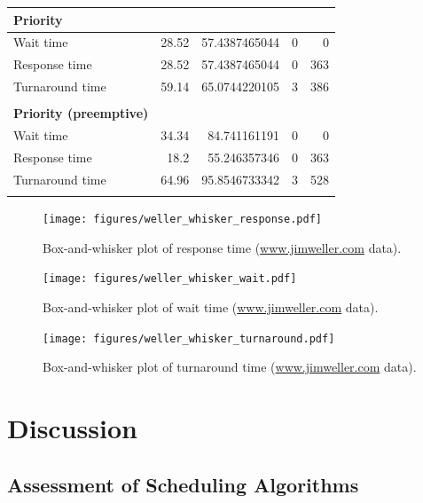 \documentclass[12pt,letterpaper]{article}
\begin{document}
\begin{table}
\begin{tabular}{l r r r r}
				\\
				\textbf{Priority} \\
				\hline
Wait time &		28.52 &	57.4387465044 &	0 &	0 	\\
Response time &		28.52 &	57.4387465044 &	0 &	363 	\\
Turnaround time &	59.14 &	65.0744220105 &	3 &	386 	\\
				\\
				\textbf{Priority (preemptive)} \\
				\hline
Wait time &		34.34 &	84.741161191 &	0 &	0 	\\
Response time &		18.2 &	55.246357346 &	0 &	363 	\\
Turnaround time &	64.96 &	95.8546733342 &	3 &	528 	\\

				\\
			\end{tabular}
		\end{table}

  	  	\begin{figure}[H]
			\centerline{\texttt{[image: figures/weller\_whisker\_response.pdf]}}
			\caption{Box-and-whisker plot of response time (\url{www.jimweller.com} data).}
			\label{fig:jim_whisker_response}
		\end{figure}

		\begin{figure}[H]
			\centerline{\texttt{[image: figures/weller\_whisker\_wait.pdf]}}
			\caption{Box-and-whisker plot of wait time (\url{www.jimweller.com} data).}
			\label{fig:jim_whisker_wait}
		\end{figure}

		\begin{figure}[H]
			\centerline{\texttt{[image: figures/weller\_whisker\_turnaround.pdf]}}
			\caption{Box-and-whisker plot of turnaround time (\url{www.jimweller.com} data).}
			\label{fig:jim_whisker_turn}
		\end{figure}

  	\section{Discussion}

  		\subsection{Assessment of Scheduling Algorithms}
\end{document}
